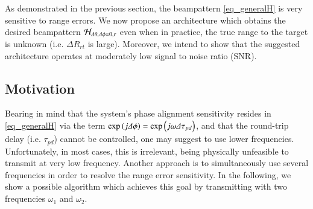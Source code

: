 As demonstrated in the previous section, the beampattern \eqref{eq_generalH} is very sensitive to range errors.
We now propose an architecture which obtains the desired beampattern $\mathcal{H}_{\Delta\theta,\Delta\phi=0,r}$ even when in practice, the true range to the target is unknown (i.e. $\Delta R_{rt}$ is large). Moreover, we intend to show that the suggested architecture operates at moderately low signal to noise ratio (SNR).

\subsection*{Motivation}
Bearing in mind that the system's phase alignment sensitivity resides in \eqref{eq_generalH} via the  term $\exp\left({j\Delta\phi}\right)=\exp\left({j\omega\Delta\tau_{pd}}\right)$, and that the round-trip delay (i.e. $\tau_{pd}$) cannot be controlled, one may suggest to use lower frequencies. Unfortunately, in most cases, this is irrelevant, being physically unfeasible to transmit at very low frequency. Another approach is to simultaneously use several frequencies in order to resolve the range error sensitivity. In the following, we show a possible algorithm which achieves this goal by transmitting with two frequencies $\omega_1$ and $\omega_2$.

